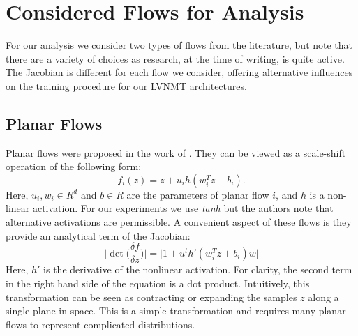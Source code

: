 



\section{Considered Flows for Analysis}

For our analysis we consider two types of flows from the literature, but note that there are a variety of choices as research, at the time of writing, is quite active. The Jacobian is different for each flow we consider, offering alternative influences on the training procedure for our \ac{LVNMT} architectures. 

\subsection{Planar Flows}

Planar flows were proposed in the work of \citet{rezende2015VIwithNF}. They can be viewed as a scale-shift operation of the following form:
\begin{equation}
f_{i}(z) = z + u_{i} h(w_{i}^{T} z + b_{i}).
\end{equation}
Here, $u_{i}, w_{i} \in R^{d}$ and $b \in R$ are the parameters of planar flow $i$, and $h$ is a non-linear activation. For our experiments we use \textit{tanh} but the authors note that alternative activations are permissible. A convenient aspect of these flows is they provide an analytical term of the Jacobian:
\begin{equation}
\bigg| \det \bigg( \frac{\delta f}{\delta z} \bigg)\bigg|  = \bigg| 1 + u^{t} h'(w_{i}^{T} z + b_{i})w \bigg|
\end{equation} 
Here, $h'$ is the derivative of the nonlinear activation. For clarity, the second term in the right hand side of the equation is a dot product. Intuitively, this transformation can be seen as contracting or expanding the samples $z$ along a single plane in space. This is a simple transformation and requires many planar flows to represent complicated distributions.  %

